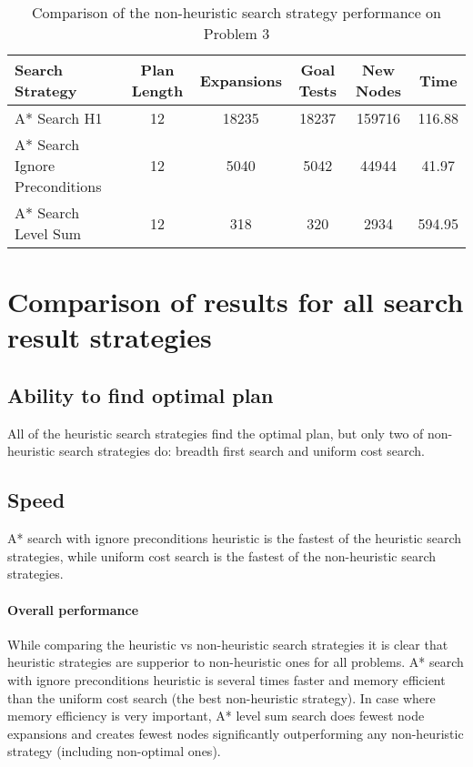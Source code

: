 \documentclass[11pt]{article}
\begin{document}
\begin{table}[H]
  \centering
  \caption{Comparison of the non-heuristic search strategy performance on Problem 3}
  \bigskip
  \label{table:hp3}
  \bgroup
  \def\arraystretch{1.5}
  \begin{tabular}{p{3.7cm}|c|c|c|c|c}
    Search Strategy & Plan Length & Expansions & Goal Tests & New Nodes & Time \\
    \hline
    A* Search H1 & 12 & 18235 & 18237 & 159716 & 116.88 \\
    A* Search Ignore Preconditions & 12 & 5040 & 5042 & 44944 & 41.97 \\
    A* Search Level Sum & 12 & 318 & 320 & 2934 & 594.95 \\
  \end{tabular}
  \egroup
\end{table}


\section{Comparison of results for all search result strategies}

\subsection{Ability to find optimal plan}

All of the heuristic search strategies find the optimal plan, but only two of non-heuristic search strategies do: breadth first search and uniform cost search.

\subsection{Speed}

A* search with ignore preconditions heuristic is the fastest of the heuristic search strategies, while uniform cost search is the fastest of the non-heuristic search strategies.

\paragraph{Overall performance}

While comparing the heuristic vs non-heuristic search strategies it is clear that heuristic strategies are supperior to non-heuristic ones for all problems. A* search with ignore preconditions heuristic is several times faster and memory efficient than the uniform cost search (the best non-heuristic strategy). In case where memory efficiency is very important, A* level sum search does fewest node expansions and creates fewest nodes significantly outperforming any non-heuristic strategy (including non-optimal ones).
\end{document}
